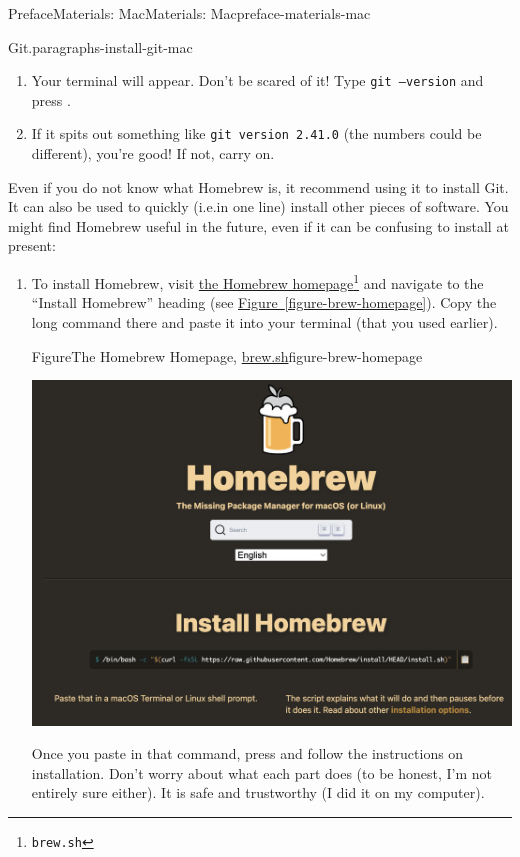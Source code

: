 \documentclass[oneside,10pt,]{book}
\newcommand{\xreffont}{\relax}
\newcommand{\mono}[1]{\texttt{#1}}
\newcommand{\kbd}[1]{\keys{{#1}}}
\begin{document}
\begin{preface}{Preface}{Materials: Mac}{}{Materials: Mac}{}{}{preface-materials-mac}
\begin{paragraphs}{Git.}{paragraphs-install-git-mac}
\begin{enumerate}
\item{}Your terminal will appear. Don't be scared of it! Type \mono{git --version} and press \kbd{Enter}.%
\item{}If it spits out something like \mono{git version 2.41.0} (the numbers could be different), you're good! If not, carry on.%
\end{enumerate}
%
\par
Even if you do not know what Homebrew is, it recommend using it to install Git. It can also be used to quickly (i.e.\@ in one line) install other pieces of software. You might find Homebrew useful in the future, even if it can be confusing to install at present:%
\begin{enumerate}
\item{}To install Homebrew, visit \href{https://brew.sh/}{the Homebrew homepage}\footnote{\nolinkurl{brew.sh}\label{fn-install-git-mac-c-b-a-a-b}} and navigate to the ``Install Homebrew'' heading (see \hyperref[figure-brew-homepage]{Figure~{\xreffont\ref{figure-brew-homepage}}}). Copy the long command there and paste it into your terminal (that you used earlier).%
\begin{figureptx}{Figure}{The Homebrew Homepage, \href{https://brew.sh/}{brew.sh}\protect\footnotemark{}}{figure-brew-homepage}{}%
\begin{image}{0.2}{0.6}{0.2}{}%
\includegraphics[width=\linewidth]{external/brew_homepage.pdf}
\end{image}%
\tcblower
\end{figureptx}%
%
Once you paste in that command, press \kbd{Enter} and follow the instructions on installation. Don't worry about what each part does (to be honest, I'm not entirely sure either). It is safe and trustworthy (I did it on my computer).%

\end{enumerate}
\end{paragraphs}
\end{preface}
\end{document}
